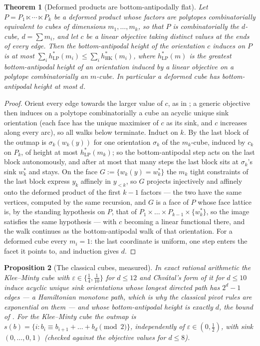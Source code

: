 \documentclass[11pt]{article}
\theoremstyle{plain}
\newtheorem{theorem}{Theorem}[section]
\newtheorem{proposition}[theorem]{Proposition}
\theoremstyle{definition}
\begin{document}
\begin{theorem}[Deformed products are bottom-antipodally flat]\label{thm:deformed-flat}
Let $P=P_1\ltimes\cdots\ltimes P_k$ be a deformed product whose factors
are polytopes combinatorially equivalent to cubes of dimensions
$m_1,\dots,m_k$, so that $P$ is combinatorially the $d$-cube,
$d=\sum m_i$, and let $c$ be a linear objective taking distinct values at
the ends of every edge. Then the bottom-antipodal height of the
orientation $c$ induces on $P$ is at most
$\sum_ih^{\ast}_{\mathrm{LP}}(m_i)\le\sum_ih^{\ast}_{\mathrm{HK}}(m_i)$,
where $h^{\ast}_{\mathrm{LP}}(m)$ is the greatest bottom-antipodal height
of an orientation induced by a linear objective on a polytope
combinatorially an $m$-cube. In particular a deformed cube has
bottom-antipodal height at most $d$.
\end{theorem}

\begin{proof}
Orient every edge towards the larger value of $c$, as in
; a generic objective then induces on a polytope
combinatorially a cube an acyclic unique sink orientation (each face has
the unique maximiser of $c$ as its sink, and $c$ increases along every
arc), so all walks below terminate. Induct on $k$. By  the
last block of the outmap is $\sigma_k(w_k(y))$ for one orientation
$\sigma_k$ of the $m_k$-cube, induced by $c_k$ on $P_k$, of height at
most $h^{\ast}_{\mathrm{LP}}(m_k)$; so the bottom-antipodal step acts on
the last block autonomously, and after at most that many steps the last
block sits at $\sigma_k$'s sink $w^{\ast}_k$ and stays. On the face
$G:=\{w_k(y)=w^{\ast}_k\}$ the $m_k$ tight constraints of the last block
express $y_k$ affinely in $y_{<k}$, so $G$ projects injectively and
affinely onto the deformed product of the first $k-1$ factors --- the two
have the same vertices, computed by the same recursion, and $G$ is a face
of $P$ whose face lattice is, by the standing hypothesis on $P$, that of
$P_1\times\dots\times P_{k-1}\times\{w^{\ast}_k\}$, so the image satisfies
the same hypothesis --- with $c$ becoming a linear functional there, and
the walk continues as the bottom-antipodal walk of that orientation. For a deformed cube every
$m_i=1$: the last coordinate is uniform, one step enters the facet it
points to, and induction gives $d$.
\end{proof}

\begin{proposition}[The classical cubes, measured]\label{prop:km-measured}
In exact rational arithmetic the Klee--Minty cube with
$\varepsilon\in\{\tfrac14,\tfrac1{10}\}$ for $d\le12$ and Chv\'atal's form
of it for $d\le10$ induce acyclic unique sink orientations whose longest
directed path has $2^{d}-1$ edges --- a Hamiltonian monotone path, which
is why the classical pivot rules are exponential on them --- and whose
bottom-antipodal height is exactly $d$, the bound of
. For the Klee--Minty cube the outmap is
$s(b)=\{i:b_i\equiv b_{i+1}+\dots+b_d\pmod2\}$, independently of
$\varepsilon\in(0,\tfrac12)$, with sink $(0,\dots,0,1)$ (checked against
the objective values for $d\le8$).
\end{proposition}
\end{document}
